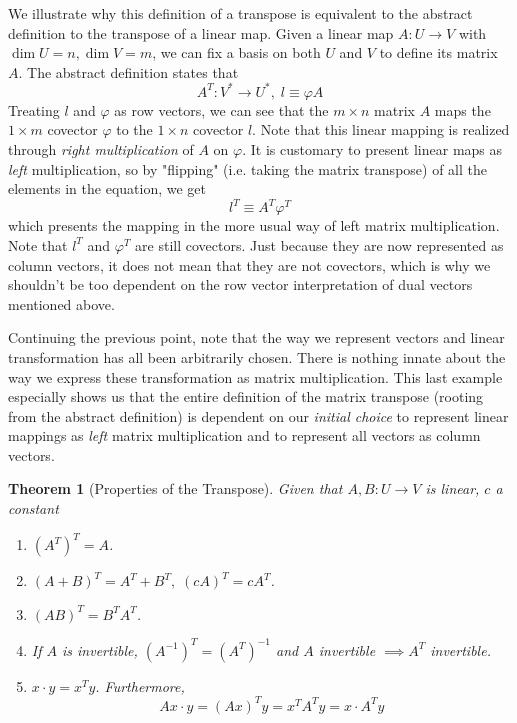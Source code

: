 \documentclass{article}
\newtheorem{theorem}{Theorem}[section]
\theoremstyle{remark}
\theoremstyle{definition}
\begin{document}
    We illustrate why this definition of a transpose is equivalent to the abstract definition to the transpose of a linear map. Given a linear map $A: U \longrightarrow V$ with $\dim U = n, \dim V = m$, we can fix a basis on both $U$ and $V$ to define its matrix $A$. The abstract definition states that 
    \[ A^T: V^* \longrightarrow U^*, \; l \equiv \varphi A\]
    Treating $l$ and $\varphi$ as row vectors, we can see that the $m \times n$ matrix $A$ maps the $1 \times m$ covector $\varphi$ to the $1 \times n$ covector $l$. Note that this linear mapping is realized through \textit{right multiplication} of $A$ on $\varphi$. It is customary to present linear maps as \textit{left} multiplication, so by "flipping" (i.e. taking the matrix transpose) of all the elements in the equation, we get 
    \[ l^T \equiv A^T \varphi^T \]
    which presents the mapping in the more usual way of left matrix multiplication. Note that $l^T$ and $\varphi^T$ are still covectors. Just because they are now represented as column vectors, it does not mean that they are not covectors, which is why we shouldn't be too dependent on the row vector interpretation of dual vectors mentioned above.  

    Continuing the previous point, note that the way we represent vectors and linear transformation has all been arbitrarily chosen. There is nothing innate about the way we express these transformation as matrix multiplication. This last example especially shows us that the entire definition of the matrix transpose (rooting from the abstract definition) is dependent on our \textit{initial choice} to represent linear mappings as \textit{left} matrix multiplication and to represent all vectors as column vectors. 

    \begin{theorem}[Properties of the Transpose]
    Given that $A, B: U \longrightarrow V$ is linear, $c$ a constant
    \begin{enumerate}
        \item $(A^T)^T = A$. 
        \item $(A+B)^T = A^T + B^T, \; (c A)^T = c A^T$. 
        \item $(A B)^T = B^T A^T$. 
        \item If $A$ is invertible, $(A^{-1})^T = (A^T)^{-1}$ and $A$ invertible $\implies A^T$ invertible. 
        \item $x \cdot y = x^T y$. Furthermore, 
    \[Ax \cdot y = (A x)^T y = x^T A^T y = x \cdot A^T y\]
    \end{enumerate}
    \end{theorem}
\end{document}
